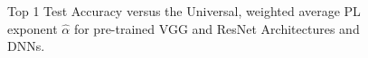 \begin{figure}[H]
   \centering
   \quad
   \caption{Top 1 Test Accuracy versus the Universal, weighted average PL exponent $\hat{\alpha}$ for pre-trained VGG and ResNet Architectures and DNNs.}
   \label{fig:bothmodels}
\end{figure}

